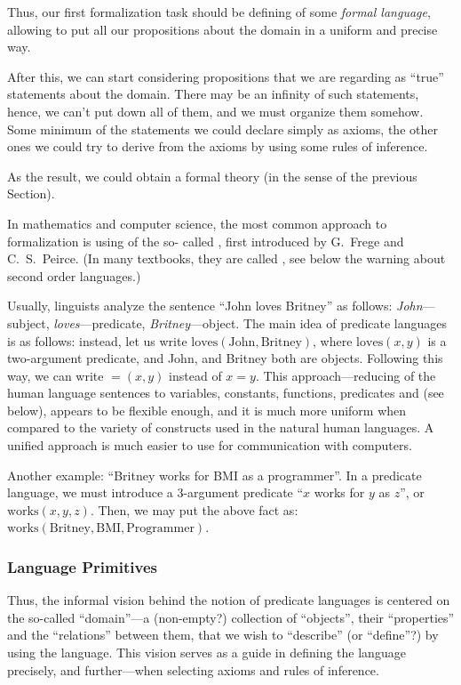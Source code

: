 Thus, our first formalization task should be defining of some \emph{formal language}, allowing to put all our propositions about the domain in a uniform and precise way.

After this, we can start considering propositions that we are regarding as ``true'' statements about the domain.
There may be an infinity of such statements, hence, we can't put down all of them, and we must organize them somehow.
Some minimum of the statements we could declare simply as axioms, the other ones we could try to derive from the axioms by using some rules of inference.

As the result, we could obtain a formal theory (in the sense of the previous Section).

In mathematics and computer science, the most common approach to formalization is using of the so-
called , first introduced by G.~Frege and C.~S.~Peirce.
(In many textbooks, they are called , see below the warning about second order languages.)

Usually, linguists analyze the sentence ``John loves Britney'' as follows: \emph{John}---subject, \emph{loves}---predicate, \emph{Britney}---object.
The main idea of predicate languages is as follows: instead, let us write \(\mathrm{loves}(\mathrm{John},\mathrm{Britney})\), where \(\mathrm{loves}(x,y)\) is a two-argument predicate, and John, and Britney both are objects.
Following this way, we can write \(=(x, y)\) instead of \(x=y\).
This approach---reducing of the human language sentences to variables, constants, functions, predicates and  (see below), appears to be flexible enough, and it is much more uniform when compared to the variety of constructs used in the natural human languages.
A unified approach is much easier to use for communication with computers.

Another example: ``Britney works for BMI as a programmer''.
In a predicate language, we must introduce a 3-argument predicate ``\(x\) works for \(y\) as \(z\)'', or \(\mathrm{works}(x, y, z)\).
Then, we may put the above fact as: \(\mathrm{works}(\mathrm{Britney}, \mathrm{BMI}, \mathrm{Programmer})\).

\subsubsection*{Language Primitives}

Thus, the informal vision behind the notion of predicate languages is centered on the so-called ``domain''---a (non-empty?) collection of ``objects'', their ``properties'' and the ``relations'' between them, that we wish to ``describe'' (or ``define''?) by using the language.
This vision serves as a guide in defining the language precisely, and further---when selecting axioms and rules of inference.

